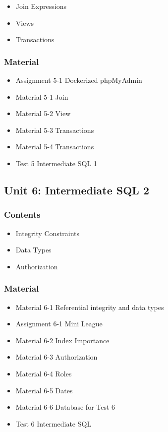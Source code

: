 \documentclass[catalan, a4paper, 12pt, titlepage]{article}
\begin{document}
  \begin{itemize}
	  \item Join Expressions
	  \item Views
	  \item Transactions
  \end{itemize}

  \subsubsection{Material}

  \begin{itemize}
	  \item Assignment 5-1 Dockerized phpMyAdmin
	  \item Material 5-1 Join 
	  \item Material 5-2 View
	  \item Material 5-3 Transactions
	  \item Material 5-4 Transactions
	  \item Test 5 Intermediate SQL 1
  \end{itemize}

  \subsection{Unit 6: Intermediate SQL 2}
  
  \subsubsection{Contents}
  \begin{itemize}
	  \item Integrity Constraints
	  \item Data Types
	  \item Authorization
  \end{itemize}

  \subsubsection{Material}
  \begin{itemize}
	  \item Material 6-1 Referential integrity and data types
	  \item Assignment 6-1 Mini League
	  \item Material 6-2 Index Importance
	  \item Material 6-3 Authorization
	  \item Material 6-4 Roles
	  \item Material 6-5 Dates
	  \item Material 6-6 Database for Test 6
	  \item Test 6 Intermediate SQL

  \end{itemize}
  
\end{document}
